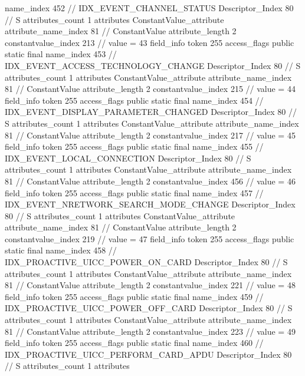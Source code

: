 {{{{{				name_index	452		// IDX_EVENT_CHANNEL_STATUS
				Descriptor_Index	80		// S
				attributes_count	1
				attributes {
				ConstantValue_attribute {
					attribute_name_index	81		// ConstantValue
					attribute_length	2
					constantvalue_index	213		// value = 43
				}
				}
			}
			field_info {
				token	255
				access_flags	public static final
				name_index	453		// IDX_EVENT_ACCESS_TECHNOLOGY_CHANGE
				Descriptor_Index	80		// S
				attributes_count	1
				attributes {
				ConstantValue_attribute {
					attribute_name_index	81		// ConstantValue
					attribute_length	2
					constantvalue_index	215		// value = 44
				}
				}
			}
			field_info {
				token	255
				access_flags	public static final
				name_index	454		// IDX_EVENT_DISPLAY_PARAMETER_CHANGED
				Descriptor_Index	80		// S
				attributes_count	1
				attributes {
				ConstantValue_attribute {
					attribute_name_index	81		// ConstantValue
					attribute_length	2
					constantvalue_index	217		// value = 45
				}
				}
			}
			field_info {
				token	255
				access_flags	public static final
				name_index	455		// IDX_EVENT_LOCAL_CONNECTION
				Descriptor_Index	80		// S
				attributes_count	1
				attributes {
				ConstantValue_attribute {
					attribute_name_index	81		// ConstantValue
					attribute_length	2
					constantvalue_index	456		// value = 46
				}
				}
			}
			field_info {
				token	255
				access_flags	public static final
				name_index	457		// IDX_EVENT_NRETWORK_SEARCH_MODE_CHANGE
				Descriptor_Index	80		// S
				attributes_count	1
				attributes {
				ConstantValue_attribute {
					attribute_name_index	81		// ConstantValue
					attribute_length	2
					constantvalue_index	219		// value = 47
				}
				}
			}
			field_info {
				token	255
				access_flags	public static final
				name_index	458		// IDX_PROACTIVE_UICC_POWER_ON_CARD
				Descriptor_Index	80		// S
				attributes_count	1
				attributes {
				ConstantValue_attribute {
					attribute_name_index	81		// ConstantValue
					attribute_length	2
					constantvalue_index	221		// value = 48
				}
				}
			}
			field_info {
				token	255
				access_flags	public static final
				name_index	459		// IDX_PROACTIVE_UICC_POWER_OFF_CARD
				Descriptor_Index	80		// S
				attributes_count	1
				attributes {
				ConstantValue_attribute {
					attribute_name_index	81		// ConstantValue
					attribute_length	2
					constantvalue_index	223		// value = 49
				}
				}
			}
			field_info {
				token	255
				access_flags	public static final
				name_index	460		// IDX_PROACTIVE_UICC_PERFORM_CARD_APDU
				Descriptor_Index	80		// S
				attributes_count	1
				attributes {
}}}}}}
